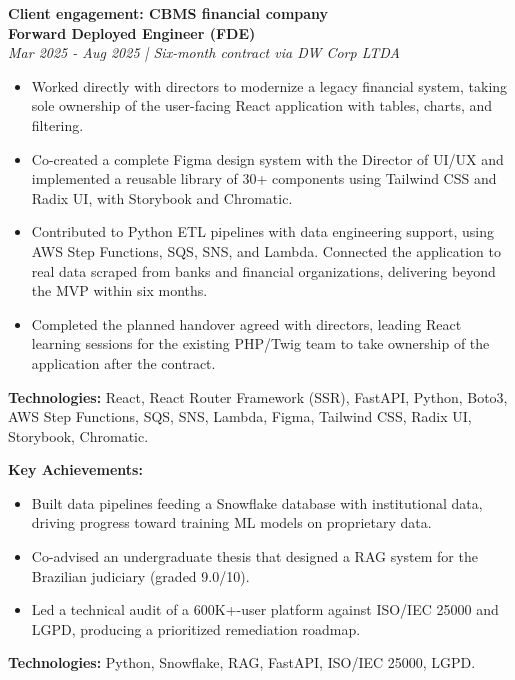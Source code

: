 \documentclass[10pt,a4paper]{altacv}
\begin{document}
\textbf{Client engagement: CBMS financial company}\\
\textbf{Forward Deployed Engineer (FDE)}\\
\textit{Mar 2025 - Aug 2025 | Six-month contract via DW Corp LTDA}
\begin{itemize}
\setlength{\itemindent}{0.5em}
\item[--] Worked directly with directors to modernize a legacy financial system, taking sole ownership of the user-facing React application with tables, charts, and filtering.
\item[--] Co-created a complete Figma design system with the Director of UI/UX and implemented a reusable library of 30+ components using Tailwind CSS and Radix UI, with Storybook and Chromatic.
\item[--] Contributed to Python ETL pipelines with data engineering support, using AWS Step Functions, SQS, SNS, and Lambda. Connected the application to real data scraped from banks and financial organizations, delivering beyond the MVP within six months.
\item[--] Completed the planned handover agreed with directors, leading React learning sessions for the existing PHP/Twig team to take ownership of the application after the contract.
\end{itemize}
\textbf{Technologies:} React, React Router Framework (SSR), FastAPI, Python, Boto3, AWS Step Functions, SQS, SNS, Lambda, Figma, Tailwind CSS, Radix UI, Storybook, Chromatic.
\vspace{4mm}


\textbf{Key Achievements:}
\begin{itemize}
\setlength{\itemindent}{0.5em}
\item[--] Built data pipelines feeding a Snowflake database with institutional data, driving progress toward training ML models on proprietary data.
\item[--] Co-advised an undergraduate thesis that designed a RAG system for the Brazilian judiciary (graded 9.0/10).
\item[--] Led a technical audit of a 600K+-user platform against ISO/IEC 25000 and LGPD, producing a prioritized remediation roadmap.
\end{itemize}
\textbf{Technologies:} Python, Snowflake, RAG, FastAPI, ISO/IEC 25000, LGPD.
\vspace{4mm}
\end{document}

